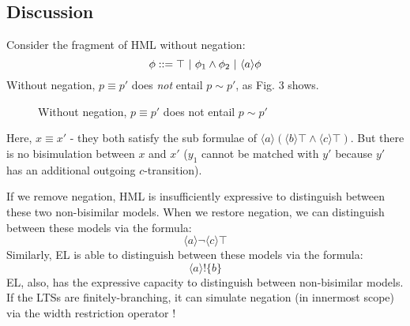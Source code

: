 \subsection{Discussion}
Consider the fragment of HML without negation:
\[
\phi ::= \top \ | \  \phi_1 \land \phi_2  \ | \  \langle a \rangle \phi
\]
Without negation, $p \equiv p'$ does \emph{not} entail $p \sim p'$, as Fig. 3 shows.
\begin{figure}[h]
\centering
{}
\caption{Without negation, $p \equiv p'$ does not entail $p \sim p'$}
\end{figure}
Here, $x \equiv x'$ - they both satisfy the sub formulae of $\langle a \rangle (\langle b \rangle \top \land \langle c \rangle \top)$.
But there is no bisimulation between $x$ and $x'$ ($y_1$ cannot be matched with $y'$ because $y'$ has an additional outgoing $c$-transition). 

If we remove negation, HML  is insufficiently expressive to distinguish between these two non-bisimilar models.
When we restore negation, we can distinguish between these models via the formula:
\[
\langle a \rangle \neg \langle c \rangle \top
\]
Similarly, EL is able to distinguish between these models via the formula:
\[
\langle a \rangle ! \{b\}
\]
EL, also, has the expressive capacity to distinguish between non-bisimilar models. If the LTSs are finitely-branching, it can simulate negation (in innermost scope) via the width restriction operator !

